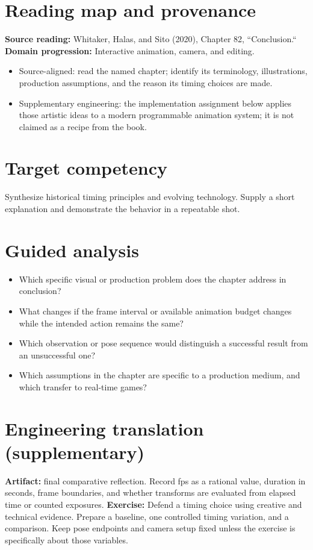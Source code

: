 \documentclass[10pt,letterpaper]{article}
\begin{document}
\makedoctitle
\makedocsummary

\section{Reading map and provenance}
\textbf{Source reading:} Whitaker, Halas, and Sito (2020), Chapter 82, ``Conclusion.``\\
\textbf{Domain progression:} Interactive animation, camera, and editing.
\begin{itemize}
\item Source-aligned: read the named chapter; identify its terminology, illustrations, production assumptions, and the reason its timing choices are made.
\item Supplementary engineering: the implementation assignment below applies those artistic ideas to a modern programmable animation system; it is not claimed as a recipe from the book.
\end{itemize}
\section{Target competency}
Synthesize historical timing principles and evolving technology. Supply a short explanation and demonstrate the behavior in a repeatable shot.
\section{Guided analysis}
\begin{itemize}
\item Which specific visual or production problem does the chapter address in conclusion?
\item What changes if the frame interval or available animation budget changes while the intended action remains the same?
\item Which observation or pose sequence would distinguish a successful result from an unsuccessful one?
\item Which assumptions in the chapter are specific to a production medium, and which transfer to real-time games?
\end{itemize}
\section{Engineering translation (supplementary)}
\textbf{Artifact:} final comparative reflection. Record fps as a rational value, duration in seconds, frame boundaries, and whether transforms are evaluated from elapsed time or counted exposures.
\textbf{Exercise:} Defend a timing choice using creative and technical evidence. Prepare a baseline, one controlled timing variation, and a comparison. Keep pose endpoints and camera setup fixed unless the exercise is specifically about those variables.
\end{document}
